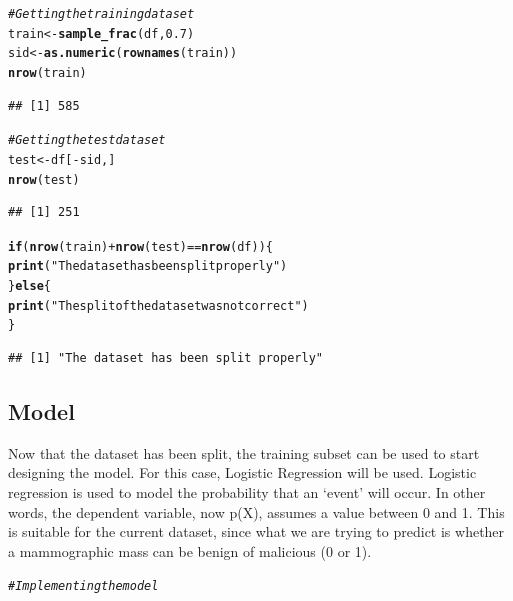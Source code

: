 \documentclass[a4paper,12pt]{article}\usepackage[]{graphicx}\usepackage[]{color}
\makeatletter
\newcommand{\hlnum}[1]{\textcolor[rgb]{0.686,0.059,0.569}{#1}}%
\newcommand{\hlstr}[1]{\textcolor[rgb]{0.192,0.494,0.8}{#1}}%
\newcommand{\hlcom}[1]{\textcolor[rgb]{0.678,0.584,0.686}{\textit{#1}}}%
\newcommand{\hlopt}[1]{\textcolor[rgb]{0,0,0}{#1}}%
\newcommand{\hlstd}[1]{\textcolor[rgb]{0.345,0.345,0.345}{#1}}%
\newcommand{\hlkwa}[1]{\textcolor[rgb]{0.161,0.373,0.58}{\textbf{#1}}}%
\newcommand{\hlkwb}[1]{\textcolor[rgb]{0.69,0.353,0.396}{#1}}%
\newcommand{\hlkwd}[1]{\textcolor[rgb]{0.737,0.353,0.396}{\textbf{#1}}}%
\newenvironment{kframe}{%
 \def\at@end@of@kframe{}%
 \ifinner\ifhmode%
  \def\at@end@of@kframe{\end{minipage}}%
  \begin{minipage}{\columnwidth}%
 \fi\fi%
 \def\FrameCommand##1{\hskip\@totalleftmargin \hskip-\fboxsep
 \colorbox{shadecolor}{##1}\hskip-\fboxsep
     \hskip-\linewidth \hskip-\@totalleftmargin \hskip\columnwidth}%
 \MakeFramed {\advance\hsize-\width
   \@totalleftmargin\z@ \linewidth\hsize
   \@setminipage}}%
 {\par\unskip\endMakeFramed%
 \at@end@of@kframe}
\newenvironment{knitrout}{}{} %
\makeatother
\begin{document}
\begin{knitrout}
\color{fgcolor}\begin{kframe}
\begin{alltt}
\hlcom{# Getting the training dataset}
\hlstd{train}\hlkwb{<-}\hlkwd{sample_frac}\hlstd{( df ,} \hlnum{0.7}\hlstd{)}
\hlstd{sid}\hlkwb{<-}\hlkwd{as.numeric}\hlstd{(}\hlkwd{rownames}\hlstd{(train))}
\hlkwd{nrow}\hlstd{(train)}
\end{alltt}
\begin{verbatim}
## [1] 585
\end{verbatim}
\begin{alltt}
\hlcom{# Getting the test dataset}
\hlstd{test} \hlkwb{<-} \hlstd{df[}\hlopt{-}\hlstd{sid,]}
\hlkwd{nrow}\hlstd{(test)}
\end{alltt}
\begin{verbatim}
## [1] 251
\end{verbatim}
\begin{alltt}
\hlkwa{if} \hlstd{(} \hlkwd{nrow}\hlstd{(train)} \hlopt{+} \hlkwd{nrow}\hlstd{(test)} \hlopt{==} \hlkwd{nrow}\hlstd{(df) )\{}
  \hlkwd{print}\hlstd{(}\hlstr{"The dataset has been split properly"}\hlstd{)}
\hlstd{\}} \hlkwa{else} \hlstd{\{}
  \hlkwd{print}\hlstd{(}\hlstr{"The split of the dataset was not correct"}\hlstd{)}
\hlstd{\}}
\end{alltt}
\begin{verbatim}
## [1] "The dataset has been split properly"
\end{verbatim}
\end{kframe}
\end{knitrout}

\clearpage

\subsection{Model}\label{model}
Now that the dataset has been split, the training subset can be used to start designing the model. For this case, Logistic Regression will be used. Logistic regression is used to model the probability that an ‘event’ will occur. In other words, the dependent variable, now p(X), assumes a value between 0 and 1. This is suitable for the current dataset, since what we are trying to predict is whether a mammographic mass can be benign of malicious (0 or 1).

\begin{knitrout}
\color{fgcolor}\begin{kframe}
\begin{alltt}
\hlcom{# Implementing the model}
\end{alltt}
\end{kframe}
\end{knitrout}
\end{document}
